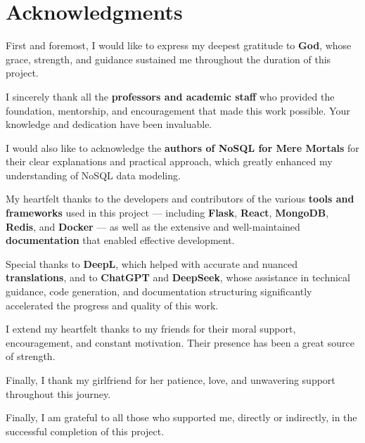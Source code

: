 

\chapter*{Acknowledgments}\label{ch:acknowledgments}



First and foremost, I would like to express my deepest gratitude to \textbf{God}, whose grace, strength, and guidance sustained me throughout the duration of this project.

I sincerely thank all the \textbf{professors and academic staff} who provided the foundation, mentorship, and encouragement that made this work possible.
Your knowledge and dedication have been invaluable.

I would also like to acknowledge the \textbf{authors of NoSQL for Mere Mortals} for their clear explanations and practical approach, which greatly enhanced my understanding of NoSQL data modeling.

My heartfelt thanks to the developers and contributors of the various \textbf{tools and frameworks} used in this project
— including \textbf{Flask}, \textbf{React}, \textbf{MongoDB}, \textbf{Redis}, and \textbf{Docker}
— as well as the extensive and well-maintained \textbf{documentation} that enabled effective development.

Special thanks to \textbf{DeepL}, which helped with accurate and nuanced \textbf{translations},
and to \textbf{ChatGPT} and \textbf{DeepSeek}, whose assistance in technical guidance, code generation,
and documentation structuring significantly accelerated the progress and quality of this work.

I extend my heartfelt thanks to my friends for their moral support, encouragement, and constant motivation.
Their presence has been a great source of strength.

Finally, I thank my girlfriend for her patience, love, and unwavering support throughout this journey.

Finally, I am grateful to all those who supported me, directly or indirectly, in the successful completion of this project.




